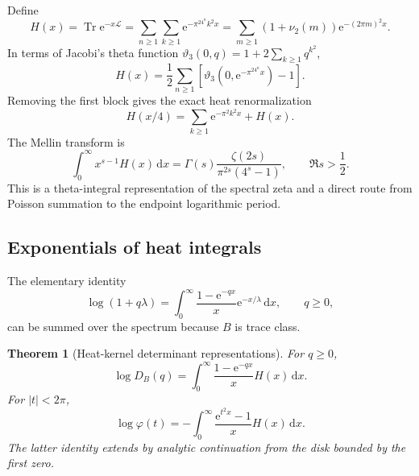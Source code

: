 \documentclass[11pt,oneside]{article}
\newtheorem{theorem}{Theorem}[section]
\theoremstyle{definition}
\newcommand{\dd}{\,\mathrm d}
\newcommand{\e}{\mathrm e}
\newcommand{\Tr}{\operatorname{Tr}}
\newcommand{\vtwo}{\nu_2}
\newcommand{\phiF}{\varphi}
\begin{document}
Define
\begin{equation}
 H(x)=\Tr\e^{-x\mathscr L}
 =\sum_{n\ge1}\sum_{k\ge1}\e^{-\pi^24^nk^2x}
 =\sum_{m\ge1}(1+\vtwo(m))\e^{-(2\pi m)^2x}.
 \label{eq:heat-trace}
\end{equation}
In terms of Jacobi's theta function
\(\vartheta_3(0,q)=1+2\sum_{k\ge1}q^{k^2}\),
\begin{equation}
 H(x)=\frac12\sum_{n\ge1}
 \left[\vartheta_3(0,\e^{-\pi^24^nx})-1\right].
 \label{eq:theta-heat}
\end{equation}
Removing the first block gives the exact heat renormalization
\begin{equation}
 H(x/4)=\sum_{k\ge1}\e^{-\pi^2k^2x}+H(x).
 \label{eq:heat-renormalization}
\end{equation}
The Mellin transform is
\begin{equation}
 \int_0^\infty x^{s-1}H(x)\dd x
 =\Gamma(s)\frac{\zeta(2s)}{\pi^{2s}(4^s-1)},
 \qquad \Re s>\frac12.
 \label{eq:heat-Mellin}
\end{equation}
This is a theta-integral representation of the spectral zeta and a direct route from
Poisson summation to the endpoint logarithmic period.

\subsection{Exponentials of heat integrals}

The elementary identity
\begin{equation}
 \log(1+q\lambda)=\int_0^\infty
 \frac{1-\e^{-qx}}x\e^{-x/\lambda}\dd x,
 \qquad q\ge0,
 \label{eq:log-heat-elementary}
\end{equation}
can be summed over the spectrum because \(B\) is trace class.

\begin{theorem}[Heat-kernel determinant representations]
\label{thm:heat-det}
For \(q\ge0\),
\begin{equation}
 \boxed{\quad
 \log D_B(q)=\int_0^\infty
 \frac{1-\e^{-qx}}x H(x)\dd x.
 \quad}
 \label{eq:positive-heat-det}
\end{equation}
For \(|t|<2\pi\),
\begin{equation}
 \boxed{\quad
 \log\phiF(t)=-\int_0^\infty
 \frac{\e^{t^2x}-1}{x}H(x)\dd x.
 \quad}
 \label{eq:real-heat-det}
\end{equation}
The latter identity extends by analytic continuation from the disk bounded by the first
zero.
\end{theorem}
\end{document}
